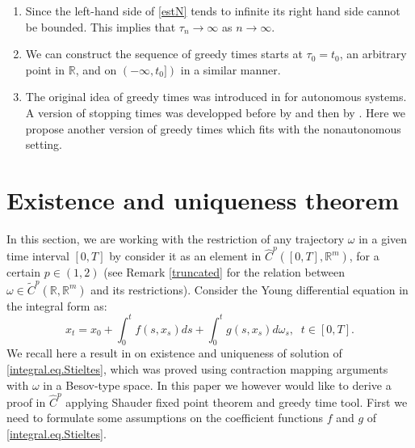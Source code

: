 \documentclass[10pt]{article}
\numberwithin{equation}{section} %
\newcommand{\R}{\ensuremath{\mathbb{R}}}
\begin{document}
\begin{remark}
\begin{enumerate}
\item  Since the left-hand side of \eqref{estN} tends to infinite its right hand side cannot be bounded. This implies that $\tau_n\to\infty$ as $n\to \infty$.
\item We can construct the sequence of greedy times starts at $\tau_0=t_0$, an arbitrary point in $\R$, and on $(-\infty, t_0])$ in a similar manner.
\item The original idea of greedy times was introduced in \cite{cassetal} for autonomous systems. A version of stopping times was developped before by \cite{GAMSch} and then by \cite{DGANS}. Here we propose another version of greedy times which fits with the nonautonomous setting.
\end{enumerate}
\end{remark}

\section{Existence and uniqueness theorem}\label{subsec.FDE}
In this section, we are working with the restriction of any trajectory $\omega$ in a given time interval $[0,T]$ by consider it as an element in  $\widehat{C}^{p}([0,T],\R^m)$, for a certain $p \in (1,2)$ (see Remark \ref{truncated} for the relation between $\omega \in \widetilde{C}^{p}(\R,\R^m)$ and its restrictions). Consider the Young differential equation in the integral form as:
\begin{equation}\label{integral.eq.Stieltes}
x_t=x_{0} +\int_0^t f(s,x_s) ds + \int_0^tg(s,x_s)d\omega_s,\;\; t\in [0,T].
\end{equation}
We recall here a result in \cite{nualart3} on existence and uniqueness of solution of \eqref{integral.eq.Stieltes}, which was proved using contraction mapping arguments with $\omega$ in a Besov-type space. In this paper we however would like to derive a proof in $\widehat{C}^p$ applying Shauder fixed point theorem and greedy time tool. First we need to formulate some assumptions on  the coefficient functions $f$ and $g$ of \eqref{integral.eq.Stieltes}.\\
 
\end{document}

